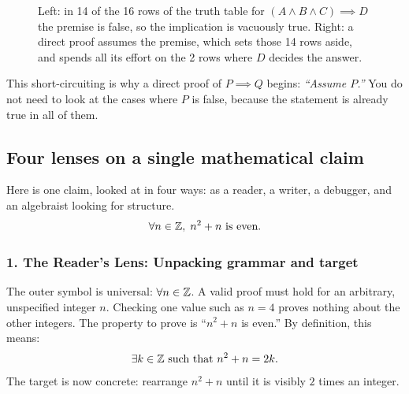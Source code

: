 \begin{figure}[htbp]
\caption{Left: in 14 of the 16 rows of the truth table for $(A \land B \land C) \implies D$ the premise is false, so the implication is vacuously true. Right: a direct proof assumes the premise, which sets those 14 rows aside, and spends all its effort on the 2 rows where $D$ decides the answer.}
\label{27:fig-short-circuit}
\end{figure}

This short-circuiting is why a direct proof of $P \implies Q$ begins: \emph{``Assume $P$.''} You do not need to look at the cases where $P$ is false, because the statement is already true in all of them.

\subsection{Four lenses on a single mathematical claim}

Here is one claim, looked at in four ways: as a reader, a writer, a debugger, and an algebraist looking for structure.
\[
\forall n \in \mathbb{Z}, \; n^2 + n \text{ is even}.
\]

\subsubsection{1. The Reader's Lens: Unpacking grammar and target}
The outer symbol is universal: $\forall n \in \mathbb{Z}$. A valid proof must hold for an arbitrary, unspecified integer $n$. Checking one value such as $n = 4$ proves nothing about the other integers.
The property to prove is ``$n^2 + n$ is even.'' By definition, this means:
\[
\exists k \in \mathbb{Z} \text{ such that } n^2 + n = 2k.
\]
The target is now concrete: rearrange $n^2 + n$ until it is visibly $2$ times an integer.

